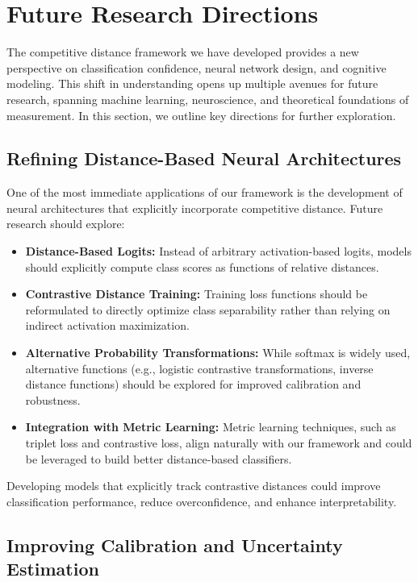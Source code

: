 \section{Future Research Directions}

The competitive distance framework we have developed provides a new perspective on classification confidence, neural network design, and cognitive modeling. This shift in understanding opens up multiple avenues for future research, spanning machine learning, neuroscience, and theoretical foundations of measurement. In this section, we outline key directions for further exploration.

\subsection{Refining Distance-Based Neural Architectures}

One of the most immediate applications of our framework is the development of neural architectures that explicitly incorporate competitive distance. Future research should explore:

\begin{itemize}
    \item \textbf{Distance-Based Logits:} Instead of arbitrary activation-based logits, models should explicitly compute class scores as functions of relative distances.
    \item \textbf{Contrastive Distance Training:} Training loss functions should be reformulated to directly optimize class separability rather than relying on indirect activation maximization.
    \item \textbf{Alternative Probability Transformations:} While softmax is widely used, alternative functions (e.g., logistic contrastive transformations, inverse distance functions) should be explored for improved calibration and robustness.
    \item \textbf{Integration with Metric Learning:} Metric learning techniques, such as triplet loss and contrastive loss, align naturally with our framework and could be leveraged to build better distance-based classifiers.
\end{itemize}

Developing models that explicitly track contrastive distances could improve classification performance, reduce overconfidence, and enhance interpretability.

\subsection{Improving Calibration and Uncertainty Estimation}

